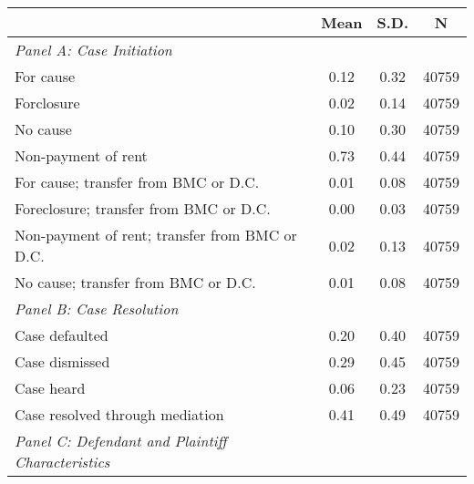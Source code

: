 \begin{table}[htbp]\centering
\def\sym#1{\ifmmode^{#1}\else\(^{#1}\)\fi}

\begin{tabular}{l*{1}{ccc}}
\toprule
                    &        Mean&        S.D.&           N\\
\midrule
\emph{Panel A: Case Initiation}&            &            &            \\
\hspace{0.25cm}For cause&        0.12&        0.32&       40759\\
\hspace{0.25cm}Forclosure&        0.02&        0.14&       40759\\
\hspace{0.25cm}No cause&        0.10&        0.30&       40759\\
\hspace{0.25cm}Non-payment of rent&        0.73&        0.44&       40759\\
\hspace{0.25cm}For cause; transfer from BMC or D.C.&        0.01&        0.08&       40759\\
\hspace{0.25cm}Foreclosure; transfer from BMC or D.C.&        0.00&        0.03&       40759\\
\hspace{0.25cm}Non-payment of rent; transfer from BMC or D.C.&        0.02&        0.13&       40759\\
\hspace{0.25cm}No cause; transfer from BMC or D.C.&        0.01&        0.08&       40759\\
\emph{Panel B: Case Resolution}&            &            &            \\
\hspace{0.25cm}Case defaulted&        0.20&        0.40&       40759\\
\hspace{0.25cm}Case dismissed&        0.29&        0.45&       40759\\
\hspace{0.25cm}Case heard&        0.06&        0.23&       40759\\
\hspace{0.25cm}Case resolved through mediation&        0.41&        0.49&       40759\\
\emph{Panel C: Defendant and Plaintiff Characteristics}&            &            &            \\

\end{tabular}
\end{table}
